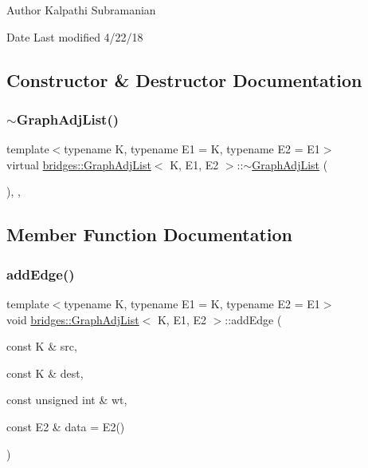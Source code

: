 \begin{DoxyAuthor}{Author}
Kalpathi Subramanian 
\end{DoxyAuthor}
\begin{DoxyDate}{Date}
Last modified 4/22/18 
\end{DoxyDate}


\subsection{Constructor \& Destructor Documentation}
\mbox{\label{classbridges_1_1_graph_adj_list_af7acceab0f85c75de56cf2fc74b3690b}} 
\subsubsection{\texorpdfstring{$\sim$\+Graph\+Adj\+List()}{~GraphAdjList()}}
{\footnotesize\ttfamily template$<$typename K, typename E1 = K, typename E2 = E1$>$ \\
virtual \mbox{\hyperlink{classbridges_1_1_graph_adj_list}{bridges\+::\+Graph\+Adj\+List}}$<$ K, E1, E2 $>$\+::$\sim$\mbox{\hyperlink{classbridges_1_1_graph_adj_list}{Graph\+Adj\+List}} (\begin{DoxyParamCaption}{ }\end{DoxyParamCaption})\hspace{0.3cm}{\ttfamily [inline]}, {\ttfamily [override]}, {\ttfamily [virtual]}}



\subsection{Member Function Documentation}
\mbox{\label{classbridges_1_1_graph_adj_list_acd9a3bf8e544a6b78e75acd6bf1d57ee}} 
\subsubsection{\texorpdfstring{add\+Edge()}{addEdge()}}
{\footnotesize\ttfamily template$<$typename K, typename E1 = K, typename E2 = E1$>$ \\
void \mbox{\hyperlink{classbridges_1_1_graph_adj_list}{bridges\+::\+Graph\+Adj\+List}}$<$ K, E1, E2 $>$\+::add\+Edge (\begin{DoxyParamCaption}\item[{const K \&}]{src,  }\item[{const K \&}]{dest,  }\item[{const unsigned int \&}]{wt,  }\item[{const E2 \&}]{data = {\ttfamily E2()} }\end{DoxyParamCaption})\hspace{0.3cm}{\ttfamily [inline]}}

